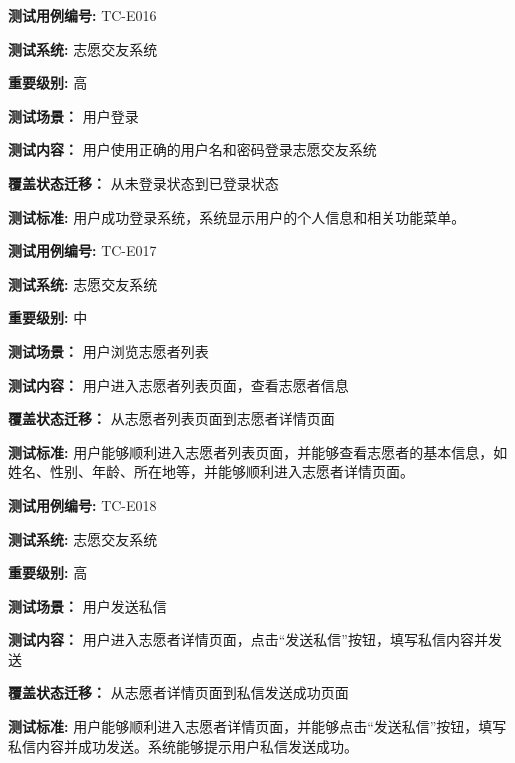 \begin{framed} \textbf{测试用例编号:} TC-E016

\textbf{测试系统:} 志愿交友系统

\textbf{重要级别:} 高

\textbf{测试场景：} 用户登录

\textbf{测试内容：} 用户使用正确的用户名和密码登录志愿交友系统

\textbf{覆盖状态迁移：} 从未登录状态到已登录状态

\textbf{测试标准:} 用户成功登录系统，系统显示用户的个人信息和相关功能菜单。

\begin{center}  \end{center} \end{framed}

\begin{framed} \textbf{测试用例编号:} TC-E017

\textbf{测试系统:} 志愿交友系统

\textbf{重要级别:} 中

\textbf{测试场景：} 用户浏览志愿者列表

\textbf{测试内容：} 用户进入志愿者列表页面，查看志愿者信息

\textbf{覆盖状态迁移：} 从志愿者列表页面到志愿者详情页面

\textbf{测试标准:} 用户能够顺利进入志愿者列表页面，并能够查看志愿者的基本信息，如姓名、性别、年龄、所在地等，并能够顺利进入志愿者详情页面。

\begin{center}  \end{center} \end{framed}

\begin{framed} \textbf{测试用例编号:} TC-E018

\textbf{测试系统:} 志愿交友系统

\textbf{重要级别:} 高

\textbf{测试场景：} 用户发送私信

\textbf{测试内容：} 用户进入志愿者详情页面，点击“发送私信”按钮，填写私信内容并发送

\textbf{覆盖状态迁移：} 从志愿者详情页面到私信发送成功页面

\textbf{测试标准:} 用户能够顺利进入志愿者详情页面，并能够点击“发送私信”按钮，填写私信内容并成功发送。系统能够提示用户私信发送成功。

\begin{center}  \end{center} \end{framed}